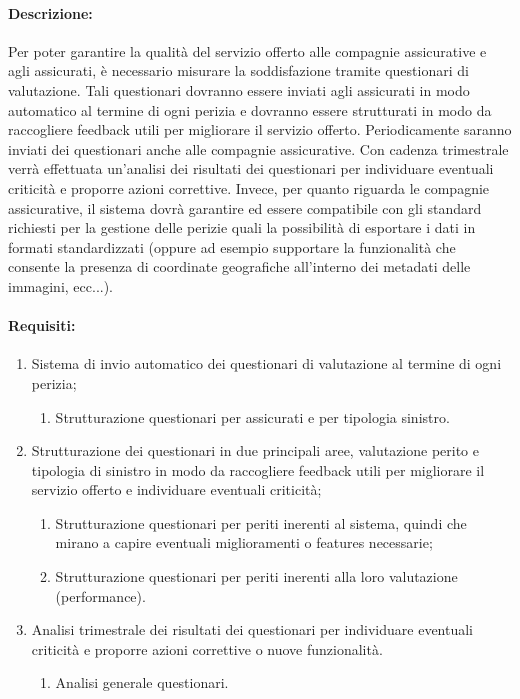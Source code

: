 \documentclass[a4paper,12pt, openright]{report}
\begin{document}
\paragraph{Descrizione:}
Per poter garantire la qualità del servizio offerto alle compagnie assicurative e agli assicurati, è necessario misurare la soddisfazione tramite questionari di valutazione. Tali questionari dovranno essere inviati agli assicurati in modo automatico al termine di ogni perizia e dovranno essere strutturati in modo da raccogliere feedback utili per migliorare il servizio offerto.
Periodicamente saranno inviati dei questionari anche alle compagnie assicurative. 
Con cadenza trimestrale verrà effettuata un'analisi dei risultati dei questionari per individuare eventuali criticità e proporre azioni correttive.
Invece, per quanto riguarda le compagnie assicurative, il sistema dovrà garantire ed essere compatibile con gli standard richiesti per la gestione delle perizie quali la possibilità di esportare i dati in formati standardizzati (oppure ad esempio supportare la funzionalità che consente la presenza di coordinate geografiche all'interno dei metadati delle immagini, ecc...).

\paragraph{Requisiti:}
\begin{enumerate}
    \item Sistema di invio automatico dei questionari di valutazione al termine di ogni perizia;
    \begin{enumerate}
        \item Strutturazione questionari per assicurati e per tipologia sinistro.
    \end{enumerate}
    \item Strutturazione dei questionari in due principali aree, valutazione perito e tipologia di sinistro in modo da raccogliere feedback utili per migliorare il servizio offerto e individuare eventuali criticità;
    \begin{enumerate}
        \item Strutturazione questionari per periti inerenti al sistema, quindi che mirano a capire eventuali miglioramenti o features necessarie;
        \item Strutturazione questionari per periti inerenti alla loro valutazione (performance).
    \end{enumerate}
    \item Analisi trimestrale dei risultati dei questionari per individuare eventuali criticità e proporre azioni correttive o nuove funzionalità.
    \begin{enumerate}
        \item Analisi generale questionari.
    \end{enumerate}
\end{enumerate}
\end{document}
